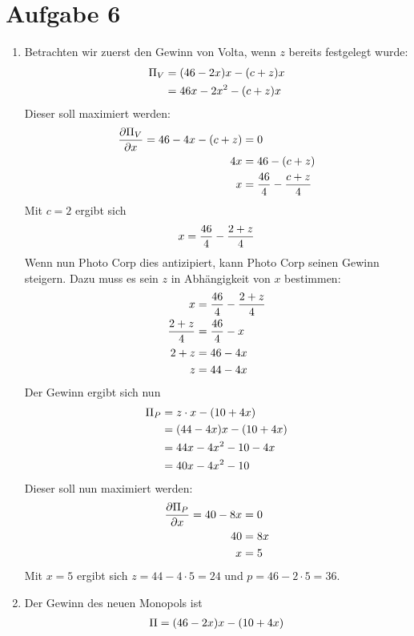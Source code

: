 \documentclass{article}
\begin{document}
	\section*{Aufgabe 6}
	\begin{enumerate}[label=(\alph*)]
		\item Betrachten wir zuerst den Gewinn von Volta, wenn $z$ bereits festgelegt wurde:
		\begin{align}
			\Pi_V &= (46-2x)x - (c+z)x \notag \\
			&= 46x - 2x^2 - (c+z)x \notag
		\end{align}
		Dieser soll maximiert werden:
		\begin{align}
			\frac{\partial\Pi_V}{\partial x} = 46-4x - (c+z) &= 0 \notag \\
			4x &= 46 - (c+z) \notag \\
			x &= \frac{46}{4} - \frac{c+z}{4} \notag
		\end{align}
		Mit $c=2$ ergibt sich
		\begin{align}
			x = \frac{46}{4} - \frac{2+z}{4} \notag
		\end{align}
		Wenn nun Photo Corp dies antizipiert, kann Photo Corp seinen Gewinn steigern. Dazu muss es sein $z$ in Abhängigkeit von $x$ bestimmen:
		\begin{align}
			x &= \frac{46}{4} - \frac{2+z}{4} \notag \\
			\frac{2+z}{4} &= \frac{46}{4} - x \notag \\
			2+z &= 46-4x \notag \\
			z &= 44-4x \notag
		\end{align}
		Der Gewinn ergibt sich nun
		\begin{align}
			\Pi_P &= z\cdot x - (10+4x) \notag \\
			&= (44-4x)x - (10+4x) \notag \\
			&= 44x-4x^2-10-4x \notag \\
			&= 40x - 4x^2 - 10 \notag
		\end{align}
		Dieser soll nun maximiert werden:
		\begin{align}
			\frac{\partial\Pi_P}{\partial x} = 40-8x &= 0 \notag \\
			40 &= 8x \notag \\
			x &= 5 \notag
		\end{align}
		Mit $x=5$ ergibt sich $z = 44-4\cdot 5 = 24$ und $p=46-2\cdot 5 = 36$.
		\item Der Gewinn des neuen Monopols ist
		\begin{align}
			\Pi &= (46-2x)x - (10+4x) \notag \\

\end{align}
\end{enumerate}
\end{document}
